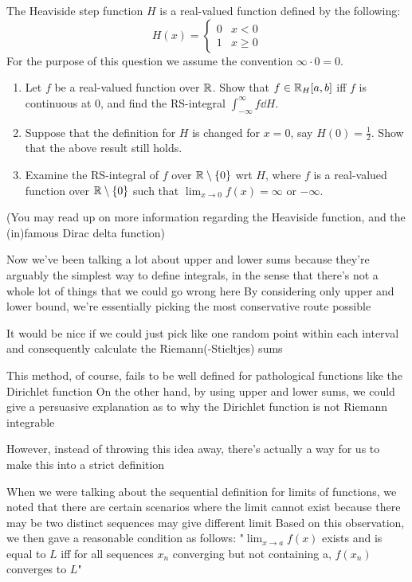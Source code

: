 \begin{exercise}{}{}
The Heaviside step function $H$ is a real-valued function defined by the following:
\[ H(x)=\begin{cases}
0 & x<0 \\
1 & x\ge0
\end{cases} \]
For the purpose of this question we assume the convention $\infty\cdot0=0$.
\begin{enumerate}[label=(\alph*)]
\item Let $f$ be a real-valued function over $\mathbb R$. Show that $f\in\mathbb R_H [a,b]$ iff $f$ is continuous at $0$, and find the RS-integral $\int_{-\infty}^\infty f\dd{H}$.
\item Suppose that the definition for $H$ is changed for $x=0$, say $H(0)=\frac{1}{2}$. Show that the above result still holds.
\item Examine the RS-integral of $f$ over $\mathbb R\setminus\{0\}$ wrt $H$, where $f$ is a real-valued function over $\mathbb R\setminus\{0\}$ such that $\lim_{x\to0}f(x)=\infty$ or $-\infty$.
\end{enumerate}
(You may read up on more information regarding the Heaviside function, and the (in)famous Dirac delta function)
\end{exercise}











Now we've been talking a lot about upper and lower sums because they're arguably the simplest way to define integrals, in the sense that there's not a whole lot of things that we could go wrong here
By considering only upper and lower bound, we're essentially picking the most conservative route possible

It would be nice if we could just pick like one random point within each interval and consequently calculate the Riemann(-Stieltjes) sums

This method, of course, fails to be well defined for pathological functions like the Dirichlet function
On the other hand, by using upper and lower sums, we could give a persuasive explanation as to why the Dirichlet function is not Riemann integrable

However, instead of throwing this idea away, there's actually a way for us to make this into a strict definition

When we were talking about the sequential definition for limits of functions, we noted that there are certain scenarios where the limit cannot exist because there may be two distinct sequences may give different limit
Based on this observation, we then gave a reasonable condition as follows:
"$\lim_{x\to a} f(x)$ exists and is equal to $L$ iff for all sequences $x_n$ converging but not containing a, $f(x_n)$ converges to $L$"

